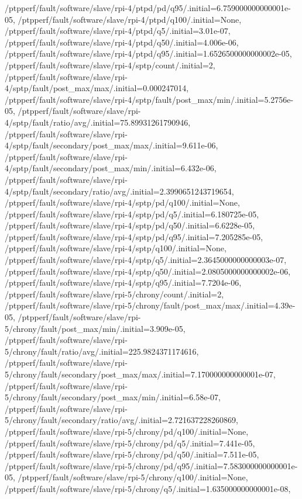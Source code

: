 {    /ptpperf/fault/software/slave/rpi-4/ptpd/pd/q95/.initial=6.759000000000001e-05,
    /ptpperf/fault/software/slave/rpi-4/ptpd/q100/.initial=None,
    /ptpperf/fault/software/slave/rpi-4/ptpd/q5/.initial=3.01e-07,
    /ptpperf/fault/software/slave/rpi-4/ptpd/q50/.initial=4.006e-06,
    /ptpperf/fault/software/slave/rpi-4/ptpd/q95/.initial=1.6526500000000002e-05,
    /ptpperf/fault/software/slave/rpi-4/sptp/count/.initial=2,
    /ptpperf/fault/software/slave/rpi-4/sptp/fault/post_max/max/.initial=0.000247014,
    /ptpperf/fault/software/slave/rpi-4/sptp/fault/post_max/min/.initial=5.2756e-05,
    /ptpperf/fault/software/slave/rpi-4/sptp/fault/ratio/avg/.initial=75.89931261790946,
    /ptpperf/fault/software/slave/rpi-4/sptp/fault/secondary/post_max/max/.initial=9.611e-06,
    /ptpperf/fault/software/slave/rpi-4/sptp/fault/secondary/post_max/min/.initial=6.432e-06,
    /ptpperf/fault/software/slave/rpi-4/sptp/fault/secondary/ratio/avg/.initial=2.3990651243719654,
    /ptpperf/fault/software/slave/rpi-4/sptp/pd/q100/.initial=None,
    /ptpperf/fault/software/slave/rpi-4/sptp/pd/q5/.initial=6.180725e-05,
    /ptpperf/fault/software/slave/rpi-4/sptp/pd/q50/.initial=6.6228e-05,
    /ptpperf/fault/software/slave/rpi-4/sptp/pd/q95/.initial=7.205285e-05,
    /ptpperf/fault/software/slave/rpi-4/sptp/q100/.initial=None,
    /ptpperf/fault/software/slave/rpi-4/sptp/q5/.initial=2.3645000000000003e-07,
    /ptpperf/fault/software/slave/rpi-4/sptp/q50/.initial=2.0805000000000002e-06,
    /ptpperf/fault/software/slave/rpi-4/sptp/q95/.initial=7.7204e-06,
    /ptpperf/fault/software/slave/rpi-5/chrony/count/.initial=2,
    /ptpperf/fault/software/slave/rpi-5/chrony/fault/post_max/max/.initial=4.39e-05,
    /ptpperf/fault/software/slave/rpi-5/chrony/fault/post_max/min/.initial=3.909e-05,
    /ptpperf/fault/software/slave/rpi-5/chrony/fault/ratio/avg/.initial=225.9824371174616,
    /ptpperf/fault/software/slave/rpi-5/chrony/fault/secondary/post_max/max/.initial=7.170000000000001e-07,
    /ptpperf/fault/software/slave/rpi-5/chrony/fault/secondary/post_max/min/.initial=6.58e-07,
    /ptpperf/fault/software/slave/rpi-5/chrony/fault/secondary/ratio/avg/.initial=2.721637228260869,
    /ptpperf/fault/software/slave/rpi-5/chrony/pd/q100/.initial=None,
    /ptpperf/fault/software/slave/rpi-5/chrony/pd/q5/.initial=7.441e-05,
    /ptpperf/fault/software/slave/rpi-5/chrony/pd/q50/.initial=7.511e-05,
    /ptpperf/fault/software/slave/rpi-5/chrony/pd/q95/.initial=7.583000000000001e-05,
    /ptpperf/fault/software/slave/rpi-5/chrony/q100/.initial=None,
    /ptpperf/fault/software/slave/rpi-5/chrony/q5/.initial=1.635000000000001e-08,
}
